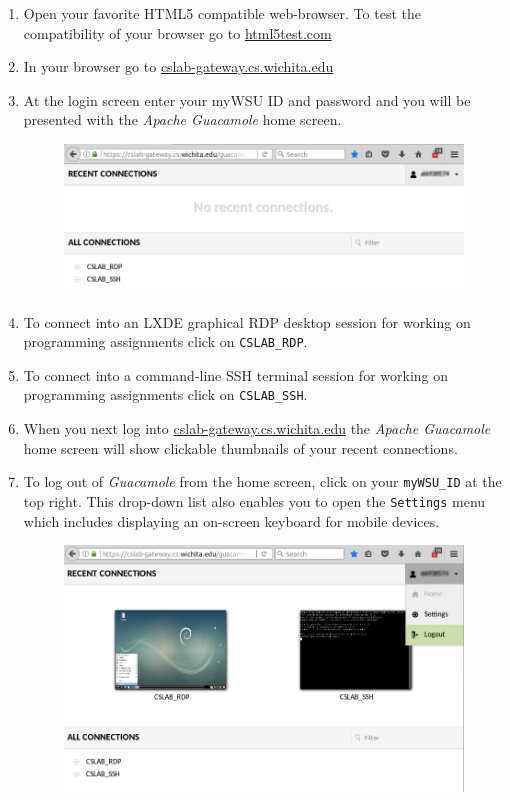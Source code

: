 \documentclass[12pt]{article}
\begin{document}
\begin{enumerate}
\item Open your favorite HTML5 compatible web-browser. To test the compatibility of your browser go to \href{https://html5test.com/}{html5test.com}
\item In your browser go to \href{https://cslab-gateway.cs.wichita.edu/}{cslab-gateway.cs.wichita.edu}
\item At the login screen enter your myWSU ID and password and you will be presented with the \textit{Apache Guacamole} home screen.
\begin{figure}[h]
\includegraphics[width=\linewidth]{screenshot_cslab_initial_homescreen}
\centering
\end{figure}
\item To connect into an LXDE graphical RDP desktop session for working on programming assignments click on \texttt{CSLAB\_RDP}.
\item To connect into a command-line SSH terminal session for working on programming assignments click on \texttt{CSLAB\_SSH}.
\item When you next log into \href{https://cslab-gateway.cs.wichita.edu/}{cslab-gateway.cs.wichita.edu} the \textit{Apache Guacamole} home screen will show clickable thumbnails of your recent connections.
\item To log out of \textit{Guacamole} from the home screen, click on your \texttt{myWSU\_ID} at the top right. This drop-down list also enables you to open the \texttt{Settings} menu which includes displaying an on-screen keyboard for mobile devices.

\begin{figure}[h]
\includegraphics[width=\linewidth]{screenshot_cslab_logout_homescreen}
\centering
\end{figure}


\end{enumerate}
\end{document}
